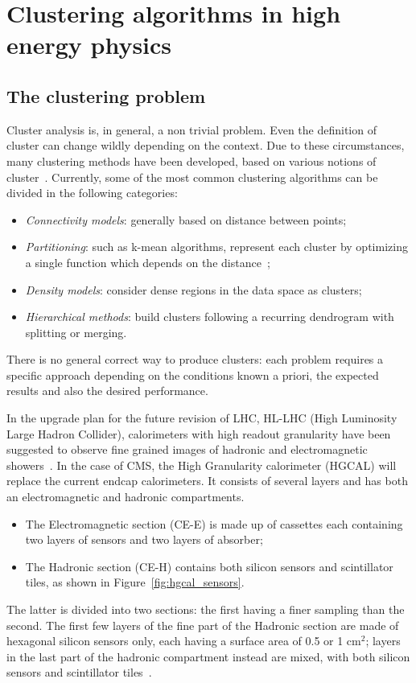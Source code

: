 \chapter{Clustering algorithms in high energy physics}
\label{ch:1}
\section{The clustering problem}
\label{ch:clustering_problem}
Cluster analysis is, in general, a non trivial problem. Even the definition of cluster can change wildly depending on the context. Due to these circumstances, many clustering methods have been developed, based on various notions of cluster~\cite{clustering}. Currently, some of the most common clustering algorithms can be divided in the following categories: 
\begin{itemize}
    \item \textit{Connectivity models}: generally based on distance between points;
    \item \textit{Partitioning}: such as k-mean algorithms, represent each cluster by optimizing a single function which depends on the distance~\cite{k-mean};
    \item \textit{Density models}: consider dense regions in the data space as clusters;
    \item \textit{Hierarchical methods}: build clusters following a recurring dendrogram with splitting or merging.
\end{itemize}
There is no general correct way to produce clusters: each problem requires a specific approach depending on the conditions known a priori, the expected results and also the desired performance.

In the upgrade plan for the future revision of LHC, HL-LHC (High Luminosity Large Hadron Collider), calorimeters with high readout granularity have been suggested to observe fine grained images of hadronic and electromagnetic showers~\cite{high_granularity}. In the case of CMS, the High Granularity calorimeter (HGCAL) will replace the current endcap calorimeters. It consists of several layers and has both an electromagnetic and hadronic compartments.
\begin{itemize}
    \item The Electromagnetic section (CE-E) is made up of cassettes each containing two layers of sensors and two layers of absorber;
    \item The Hadronic section (CE-H) contains both silicon sensors and scintillator tiles, as shown in Figure~\ref{fig:hgcal_sensors}. 
\end{itemize}
The latter is divided into two sections: the first having a finer sampling than the second. The first few layers of the fine part of the Hadronic section are made of hexagonal silicon sensors only, each having a surface area of 0.5 or 1 cm$^2$; layers in the last part of the hadronic compartment instead are mixed, with both silicon sensors and scintillator tiles~\cite{hgcal}.

